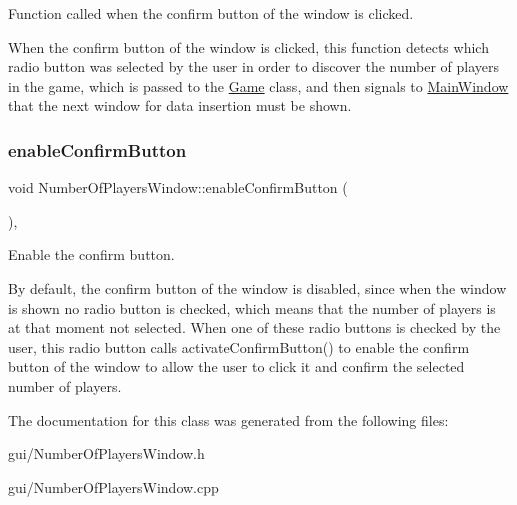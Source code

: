 Function called when the confirm button of the window is clicked. 

When the confirm button of the window is clicked, this function detects which radio button was selected by the user in order to discover the number of players in the game, which is passed to the \hyperlink{classGame}{Game} class, and then signals to \hyperlink{classMainWindow}{Main\+Window} that the next window for data insertion must be shown. \mbox{\label{classNumberOfPlayersWindow_a7fe10b716af29b5cca42267a391587ec}} 
\subsubsection{\texorpdfstring{enable\+Confirm\+Button}{enableConfirmButton}}
{\footnotesize\ttfamily void Number\+Of\+Players\+Window\+::enable\+Confirm\+Button (\begin{DoxyParamCaption}{ }\end{DoxyParamCaption})\hspace{0.3cm}{\ttfamily [private]}, {\ttfamily [slot]}}



Enable the confirm button. 

By default, the confirm button of the window is disabled, since when the window is shown no radio button is checked, which means that the number of players is at that moment not selected. When one of these radio buttons is checked by the user, this radio button calls activate\+Confirm\+Button() to enable the confirm button of the window to allow the user to click it and confirm the selected number of players. 

The documentation for this class was generated from the following files\+:\begin{DoxyCompactItemize}
\item 
gui/Number\+Of\+Players\+Window.\+h\item 
gui/Number\+Of\+Players\+Window.\+cpp\end{DoxyCompactItemize}
